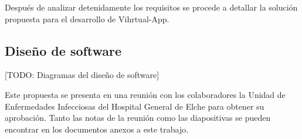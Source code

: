 Después de analizar detenidamente los requisitos se procede a detallar la solución propuesta para el desarrollo de Vihrtual-App.


\subsection{Diseño de software}
[TODO: Diagramas del diseño de software]


Este propuesta se presenta en una reunión con los colaboradores la Unidad de Enfermedades Infecciosas del Hospital General de Elche para obtener su aprobación. Tanto las notas de la reunión como las diapositivas se pueden encontrar en los documentos anexos a este trabajo.\\
